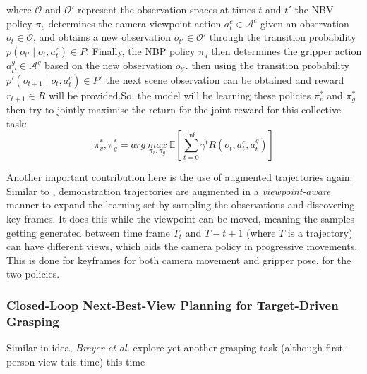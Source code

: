 where $\mathcal{O}$ and $\mathcal{O}'$ represent the observation spaces at times $t$ and $t'$ the NBV policy $\pi_v$ determines the camera viewpoint action $a_t^c \in \mathcal{A}^c$ given an observation $o_t \in \mathcal{O}$, and obtains a new observation $o_{t'} \in \mathcal{O}'$ through the transition probability $p\left(o_{t'} \mid o_t, a_t^c\right) \in P$. Finally, the NBP policy $\pi_g$ then determines the gripper action $a^g_{t'} \in \mathcal{A}^g$ based on the new observation $o_{t'}$. then using the transition probability $p'\left(o_{t+1} \mid o_t, a^c_t\right) \in P'$ the next scene observation can be obtained and reward $r_{t+1} \in R$ will be provided.So, the model will be learning these policies $\pi^*_v$ and $\pi^*_g$ then try to jointly maximise the return for the joint reward for this collective task: 
\[
  \pi_v^*, \pi_g^* = 
  arg~\underset{\pi_v, \pi_g}{max} 
  ~\mathbb{E}
  \left[
    \sum_{t=0}^{\inf}{\gamma^t R(o_t, a^c_t, a^g_t)}
  \right]
\]

Another important contribution here is the use of augmented trajectories again. Similar to \cite{papagiannis2024milesmakingimitationlearning}, demonstration trajectories are augmented in a \emph{viewpoint-aware} manner to expand the learning set by sampling the observations and discovering key frames. It does this while the viewpoint can be moved, meaning the samples getting generated between time frame $T_t$ and $T-{t+1}$ (where $T$ is a trajectory) can have different views, which aids the camera policy in progressive movements. This is done for keyframes for both camera movement and gripper pose, for the two policies.

\subsubsection{Closed-Loop Next-Best-View Planning for Target-Driven Grasping}
Similar in idea, \emph{Breyer et al.} explore yet another grasping task (although first-person-view this time) this time
